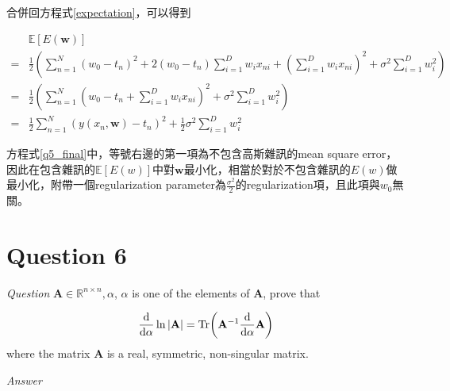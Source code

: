 \documentclass{article}
\begin{document}
合併回方程式\ref{expectation}，可以得到

\begin{equation}\label{q5_final}
\begin{aligned}
 &\mathbb E[E(\mathbf w)]\\
=& \frac{1}{2}\left(\sum\limits_{n=1}^N (w_0-t_n)^2+2(w_0-t_n)\sum\limits_{i=1}^D w_i x_{ni}+\left(\sum\limits_{i=1}^D w_i x_{ni}\right)^2 + \sigma^2\sum\limits_{i=1}^D w_i^2\right)\\
=& \frac{1}{2}\left(\sum\limits_{n=1}^N \left(w_0-t_n+\sum\limits_{i=1}^D w_i x_{ni}\right)^2 + \sigma^2\sum\limits_{i=1}^D w_i^2\right)\\
=& \frac{1}{2}\sum\limits_{n=1}^N (y(x_n, \mathbf w)-t_n)^2 + \frac{1}{2}\sigma^2\sum\limits_{i=1}^D w_i^2
\end{aligned}
\end{equation}

方程式\ref{q5_final}中，等號右邊的第一項為不包含高斯雜訊的mean square error，因此在包含雜訊的$\mathbb E[E(w)]$中對$\mathbf w$最小化，相當於對於不包含雜訊的$E(w)$做最小化，附帶一個regularization parameter為$\frac{\sigma^2}{2}$的regularization項，且此項與$w_0$無關。

\section{Question 6}

\emph{Question} $\mathbf A \in \mathbb R^{n \times n}, \alpha$, $\alpha$ is one of the elements of $\mathbf A$, prove that

\begin{equation*}
\frac{\mathrm d}{\mathrm d \alpha }\ln|\mathbf A|= \rm Tr\bigg(\mathbf A^{-1}\frac{\mathrm d}{\mathrm d \alpha}\mathbf A \bigg)
\end{equation*}
where the matrix $\mathbf A$ is a real, symmetric, non-singular matrix.

\emph{Answer}
\end{document}
